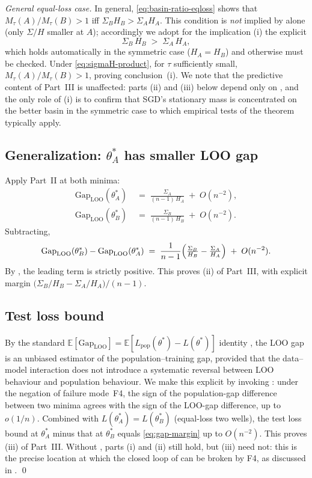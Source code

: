 \documentclass[11pt,a4paper]{article}
\theoremstyle{definition}
\theoremstyle{remark}
\newcommand{\E}{\mathbb{E}}
\newcommand{\Gap}{\mathrm{Gap}}
\newcommand{\LOO}{\mathrm{LOO}}
\begin{document}
\emph{General equal-loss case.}  In general,
\eqref{eq:basin-ratio-eqloss} shows that $M_\tau(A)/M_\tau(B) > 1$ iff
$\Sigma_B H_B > \Sigma_A H_A$.  This condition is \emph{not} implied by
 alone (only $\Sigma/H$ smaller at $A$); accordingly we
adopt for the implication (i) the explicit
\begin{equation}\label{eq:sigmaH-product}
   \Sigma_B\,H_B \;>\; \Sigma_A\,H_A,
\end{equation}
which holds automatically in the symmetric case ($H_A=H_B$) and
otherwise must be checked.  Under \eqref{eq:sigmaH-product}, for
$\tau$ sufficiently small, $M_\tau(A)/M_\tau(B) > 1$, proving
conclusion~(i).  We note that the predictive content of Part~III is
unaffected: parts (ii) and (iii) below depend only on , and
the only role of (i) is to confirm that SGD's stationary mass is
concentrated on the better basin in the symmetric case to which
empirical tests of the theorem typically apply.

\subsection{Generalization: $\theta_A^*$ has smaller LOO gap}

Apply Part~II at both minima:
\begin{align*}
   \Gap_{\LOO}(\theta_A^*) &\;=\;
       \frac{\Sigma_A}{(n-1)\,H_A}\;+\; O(n^{-2}),\\
   \Gap_{\LOO}(\theta_B^*) &\;=\;
       \frac{\Sigma_B}{(n-1)\,H_B}\;+\; O(n^{-2}).
\end{align*}
Subtracting,
\[
   \Gap_{\LOO}(\theta_B^*) - \Gap_{\LOO}(\theta_A^*)
   \;=\; \frac{1}{n-1}\Bigl(\tfrac{\Sigma_B}{H_B}
                                       - \tfrac{\Sigma_A}{H_A}\Bigr)
            \;+\; O(n^{-2}).
\]
By , the leading term is strictly positive.  This proves
(ii) of Part~III, with explicit margin
$\bigl(\Sigma_B/H_B - \Sigma_A/H_A\bigr)/(n-1)$.

\subsection{Test loss bound}

By the standard $\E[\Gap_{\LOO}] = \E[L_{\text{pop}}(\theta^*) -
L(\theta^*)]$ identity \cite{BousquetElisseeff2002}, the LOO gap is an
unbiased estimator of the population--training gap, provided that the
data--model interaction does not introduce a systematic reversal between
LOO behaviour and population behaviour.  We make this explicit by
invoking : under the negation of failure mode~F4, the
sign of the population-gap difference between two minima agrees with
the sign of the LOO-gap difference, up to $o(1/n)$.  Combined with
$L(\theta_A^*) = L(\theta_B^*)$ (equal-loss two wells), the test loss
bound at $\theta_A^*$ minus that at $\theta_B^*$ equals
\eqref{eq:gap-margin} up to $O(n^{-2})$.  This proves (iii) of
Part~III.  Without , parts (i) and (ii) still hold, but
(iii) need not: this is the precise location at which the closed loop
of  can be broken by F4, as discussed in
.
\qed
\end{document}

